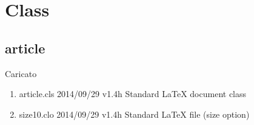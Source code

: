 \chapter{Class}
\section{article}

Caricato
\begin{enumerate}
\item 	article.cls 2014/09/29 v1.4h Standard LaTeX document class
\item size10.clo 2014/09/29 v1.4h Standard LaTeX file (size option)
\end{enumerate}
